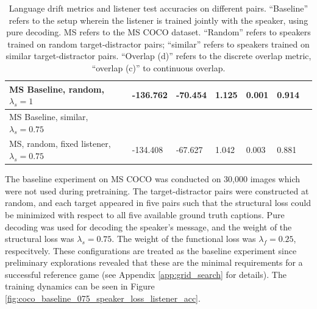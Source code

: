 \begin{table}[]
\begin{tabularx}{\textwidth}{|X|l|l|X|X|X|X|}
		MS Baseline, random, $\lambda_s =1$  &      -136.762             &          -70.454              &         1.125             &          0.001            &                   0.914                       &                                           \\ \hline
		MS Baseline, similar, $\lambda_s = 0.75$  &                   &                        &                      &                      &                                          &                                           \\ \hline
		MS, random, fixed listener, $\lambda_s = 0.75$  &         -134.408          &           -67.627             &     1.042                 &        0.003              &                          0.881                &                                           \\ \hline
	\end{tabularx}
\caption{\label{tab:coco_drift_metrics_basic} Language drift metrics and listener test accuracies on different pairs. 
	``Baseline'' refers to the setup wherein the listener is trained jointly with the speaker, using pure decoding. MS refers to the MS COCO dataset. ``Random'' refers to speakers trained on random target-distractor pairs; ``similar'' refers to speakers trained on similar target-distractor pairs. ``Overlap (d)'' refers to the discrete overlap metric, ``overlap (c)'' to continuous overlap.}
\end{table}

The baseline experiment on MS COCO was conducted on 30,000 images which were not used during pretraining. The target-distractor pairs were constructed at random, and each target appeared in five pairs such that the structural loss could be minimized with respect to all five available ground truth captions. Pure decoding was used for decoding the speaker's message, and the weight of the structural loss was $\lambda_s = 0.75$. The weight of the functional loss was $\lambda_f = 0.25$, respecitvely. These configurations are treated as the baseline experiment since preliminary explorations revealed that these are the minimal requirements for a successful reference game (see Appendix \ref{app:grid_search} for details). The training dynamics can be seen in Figure \ref{fig:coco_baseline_075_speaker_loss_listener_acc}.

